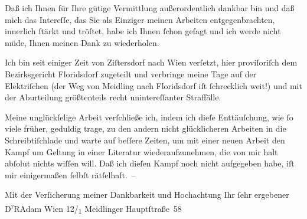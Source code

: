 \pstart
           Daß ich Ihnen für Ihre gütige Vermittlung außerordentlich dankbar bin und daß mich
               das {\pb}Intereſſe, das Sie als Einziger meinen Arbeiten
               entgegenbrachten, innerlich{ }ſtärkt und tröſtet, habe ich Ihnen{ }ſchon geſagt und ich
               werde nicht müde, Ihnen meinen Dank zu wiederholen.\pend
           
\pstart
           Ich bin seit einiger Zeit von Ziſtersdorf nach
                  Wien verſetzt, hier proviſoriſch dem Bezirksgericht Floridsdorf zugeteilt und verbringe
               meine Tage auf der Elektriſchen (der Weg von Meidling nach Floridsdorf iſt{ }ſchrecklich
               weit!) und mit der Aburteilung größtenteils recht unintereſſanter Straffälle.\pend
           
\pstart
           Meine unglückſelige Arbeit verſchließe ich, indem ich dieſe Enttäuſchung, wie{ }ſo
               viele früher, geduldig trage, zu den andern nicht glücklicheren Arbeiten in die
               Schreibtiſchlade und warte auf beſſere Zeiten, um mit einer neuen Arbeit den Kampf um
               Geltung in einer Literatur wiederaufzunehmen, die von mir halt abſolut nichts wiſſen
               will. Daß ich die{\pb}ſen Kampf noch nicht aufgegeben
               habe, iſt mir einigermaßen{ }ſelbſt rätſelhaft. –\pend
           
\pstart
           Mit der Verſicherung meiner Dankbarkeit und Hochachtung Ihr{ }ſehr ergebener\pend
           \pstart \spacefill\mbox{D\textsuperscript{r}RAdam}\pend{}
\pstart
           \noindent{}Wien 12/\textsubscript{1} Meidlinger
                     Hauptſtraße 58\pend
           \endnumbering{}  \newcommand{\dateiname}{L02219}\newcommand{\titel}{Robert Adam an Arthur Schnitzler, 26. 9. 1915}\newcommand{\editorInnen}{Martin Anton Müller und Gerd-Hermann Susen}
